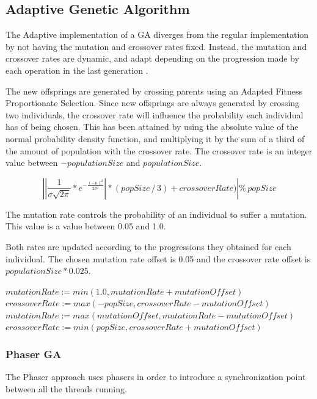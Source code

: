 \documentclass[runningheads]{llncs}
\begin{document}
\subsection{Adaptive Genetic Algorithm}
The Adaptive implementation of a GA diverges from the regular implementation by not having the mutation and crossover rates fixed. Instead, the mutation and crossover rates are dynamic, and adapt depending on the progression made by each operation in the last generation \cite{adaptativeCrossOverMutation}.

The new offsprings are generated by crossing parents using an Adapted Fitness Proportionate Selection. Since new offsprings are always generated by crossing two individuals, the crossover rate will influence the probability each individual has of being chosen. This has been attained by using the absolute value of the normal probability density function, and multiplying it by the sum of a third of the amount of population with the crossover rate. The crossover rate is an integer value between \(-populationSize\) and \(populationSize\).

\[ \left |\left | \frac{1}{\sigma \sqrt{2\pi}}*e^{-\frac{(-\mu)^2}{2\sigma^2}} \right | * (popSize\,/\,3) + crossoverRate)  \right | \%  \, popSize \]	

The mutation rate controls the probability of an individual to suffer a mutation. This value is a value between 0.05 and 1.0.

Both rates are updated according to the progressions they obtained for each individual. The chosen mutation rate offset is 0.05 and the crossover rate offset is \(populationSize * 0.025\).

\begin{algorithmic}
        \State $mutationRate := min(1.0, mutationRate + mutationOffset)$
        \State $crossoverRate := max(-popSize, crossoverRate - mutationOffset)$
\EndIf
{}
        \State $mutationRate := max(mutationOffset, mutationRate - mutationOffset)$
        \State $crossoverRate := min(popSize, crossoverRate + mutationOffset)$
\EndIf
\end{algorithmic}

\subsubsection{Phaser GA} \hfill \par

The Phaser approach uses phasers in order to introduce a synchronization point between all the threads running.
\end{document}
